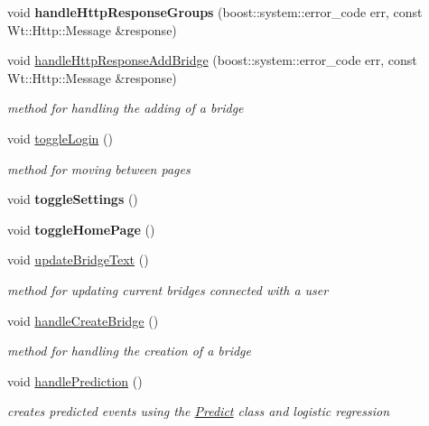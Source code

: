 \begin{DoxyCompactItemize}
\mbox{\label{class_home_page_a0a9851d03cb1adcfe9a28f2546cbd765}} 
void {\bfseries handle\+Http\+Response\+Groups} (boost\+::system\+::error\+\_\+code err, const Wt\+::\+Http\+::\+Message \&response)
\item 
void \hyperlink{class_home_page_a5a1923f90a2ac6367869f9423e9a3559}{handle\+Http\+Response\+Add\+Bridge} (boost\+::system\+::error\+\_\+code err, const Wt\+::\+Http\+::\+Message \&response)
\begin{DoxyCompactList}\small\item\em method for handling the adding of a bridge \end{DoxyCompactList}\item 
void \hyperlink{class_home_page_a3823da7245637b5b16eec173660661fc}{toggle\+Login} ()
\begin{DoxyCompactList}\small\item\em method for moving between pages \end{DoxyCompactList}\item 
\mbox{\label{class_home_page_a25916e36819153779ac8194b2c76c725}} 
void {\bfseries toggle\+Settings} ()
\item 
\mbox{\label{class_home_page_a4121a0ab427705dba5b929d4331f8a9c}} 
void {\bfseries toggle\+Home\+Page} ()
\item 
void \hyperlink{class_home_page_a0231c983e866ff4f574d9f26cac7c944}{update\+Bridge\+Text} ()
\begin{DoxyCompactList}\small\item\em method for updating current bridges connected with a user \end{DoxyCompactList}\item 
void \hyperlink{class_home_page_aca01e2e44b307cb44aa0f23ab5d5b25b}{handle\+Create\+Bridge} ()
\begin{DoxyCompactList}\small\item\em method for handling the creation of a bridge \end{DoxyCompactList}\item 
void \hyperlink{class_home_page_a8e33de7e775f85f91d7792eb315b8015}{handle\+Prediction} ()
\begin{DoxyCompactList}\small\item\em creates predicted events using the \hyperlink{class_predict}{Predict} class and logistic regression \end{DoxyCompactList}\item 

\end{DoxyCompactItemize}
